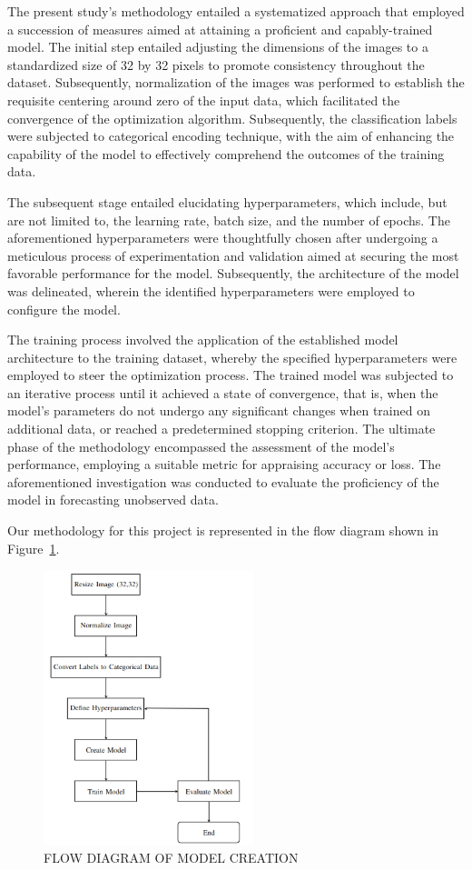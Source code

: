 \documentclass[conference]{IEEEtran}
\begin{document}
The present study's methodology entailed a systematized approach that employed a succession of measures aimed at attaining a proficient and capably-trained model. The initial step entailed adjusting the dimensions of the images to a standardized size of 32 by 32 pixels to promote consistency throughout the dataset. Subsequently, normalization of the images was performed to establish the requisite centering around zero of the input data, which facilitated the convergence of the optimization algorithm. Subsequently, the classification labels were subjected to categorical encoding technique, with the aim of enhancing the capability of the model to effectively comprehend the outcomes of the training data.

The subsequent stage entailed elucidating hyperparameters, which include, but are not limited to, the learning rate, batch size, and the number of epochs. The aforementioned hyperparameters were thoughtfully chosen after undergoing a meticulous process of experimentation and validation aimed at securing the most favorable performance for the model. Subsequently, the architecture of the model was delineated, wherein the identified hyperparameters were employed to configure the model.

The training process involved the application of the established model architecture to the training dataset, whereby the specified hyperparameters were employed to steer the optimization process. The trained model was subjected to an iterative process until it achieved a state of convergence, that is, when the model's parameters do not undergo any significant changes when trained on additional data, or reached a predetermined stopping criterion.
The ultimate phase of the methodology encompassed the assessment of the model's performance, employing a suitable metric for appraising accuracy or loss. The aforementioned investigation was conducted to evaluate the proficiency of the model in forecasting unobserved data. 

Our methodology for this project is represented in the flow diagram shown in Figure~\ref{Fig:Figure2}. 

\begin{figure}[t!]
\centering
 \includegraphics[height=8cm]{Images/flowchart.png}
\caption{FLOW DIAGRAM OF MODEL CREATION}
\label{Fig:Figure2}
\end{figure}
\end{document}
